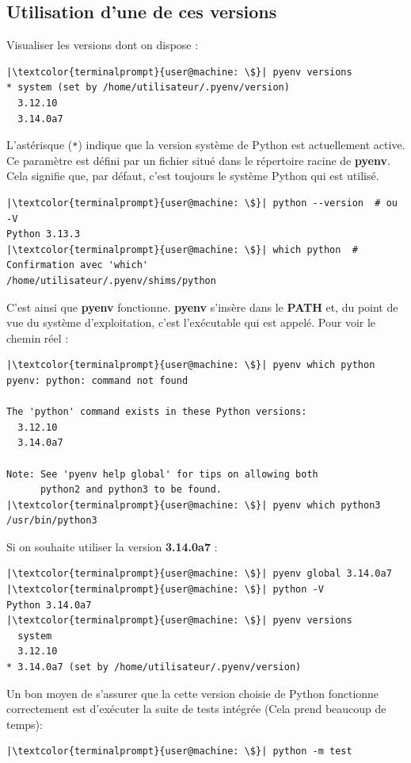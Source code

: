 \subsection*{Utilisation d'une de ces versions}
Visualiser les versions dont on dispose :
\begin{lstlisting}[style=terminal]
|\textcolor{terminalprompt}{user@machine: \$}| pyenv versions
* system (set by /home/utilisateur/.pyenv/version)
  3.12.10
  3.14.0a7
\end{lstlisting}

L'astérisque (\texttt{*}) indique que la version système de Python est actuellement active. Ce paramètre est défini par un fichier situé dans le répertoire racine de \textbf{pyenv}. Cela signifie que, par défaut, c'est toujours le système Python qui est utilisé.
\begin{lstlisting}[style=terminal]
|\textcolor{terminalprompt}{user@machine: \$}| python --version  # ou -V
Python 3.13.3
|\textcolor{terminalprompt}{user@machine: \$}| which python  # Confirmation avec 'which'
/home/utilisateur/.pyenv/shims/python
\end{lstlisting}

C'est ainsi que \textbf{pyenv} fonctionne. \textbf{pyenv} s'insère dans le \textbf{PATH} et, du point de vue du système d'exploitation, c'est l'exécutable qui est appelé. Pour voir le chemin réel :
\begin{lstlisting}[style=terminal]
|\textcolor{terminalprompt}{user@machine: \$}| pyenv which python
pyenv: python: command not found

The 'python' command exists in these Python versions:
  3.12.10
  3.14.0a7

Note: See 'pyenv help global' for tips on allowing both
      python2 and python3 to be found.
|\textcolor{terminalprompt}{user@machine: \$}| pyenv which python3
/usr/bin/python3
\end{lstlisting}

Si on souhaite utiliser la version \textbf{3.14.0a7} :
\begin{lstlisting}[style=terminal]
|\textcolor{terminalprompt}{user@machine: \$}| pyenv global 3.14.0a7
|\textcolor{terminalprompt}{user@machine: \$}| python -V
Python 3.14.0a7
|\textcolor{terminalprompt}{user@machine: \$}| pyenv versions
  system
  3.12.10
* 3.14.0a7 (set by /home/utilisateur/.pyenv/version)
\end{lstlisting}

Un bon moyen de s'assurer que la cette version choisie de Python fonctionne correctement est d'exécuter la suite de tests intégrée (Cela prend beaucoup de temps):
\begin{lstlisting}[style=terminal]
|\textcolor{terminalprompt}{user@machine: \$}| python -m test
\end{lstlisting}

